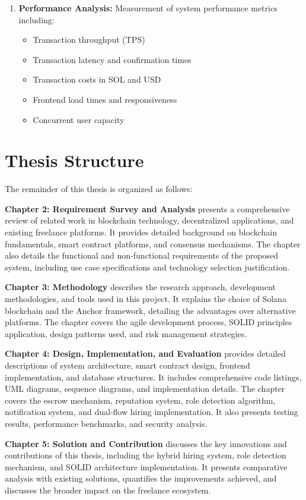 \documentclass[a4paper,13pt,twoside]{report}
\theoremstyle{definition}
\begin{document}
\begin{enumerate}
    \item \textbf{Performance Analysis:} Measurement of system performance metrics including:
    \begin{itemize}
        \item Transaction throughput (TPS)
        \item Transaction latency and confirmation times
        \item Transaction costs in SOL and USD
        \item Frontend load times and responsiveness
        \item Concurrent user capacity
    \end{itemize}
\end{enumerate}

\section{Thesis Structure}

The remainder of this thesis is organized as follows:

\textbf{Chapter 2: Requirement Survey and Analysis} presents a comprehensive review of related work in blockchain technology, decentralized applications, and existing freelance platforms. It provides detailed background on blockchain fundamentals, smart contract platforms, and consensus mechanisms. The chapter also details the functional and non-functional requirements of the proposed system, including use case specifications and technology selection justification.

\textbf{Chapter 3: Methodology} describes the research approach, development methodologies, and tools used in this project. It explains the choice of Solana blockchain and the Anchor framework, detailing the advantages over alternative platforms. The chapter covers the agile development process, SOLID principles application, design patterns used, and risk management strategies.

\textbf{Chapter 4: Design, Implementation, and Evaluation} provides detailed descriptions of system architecture, smart contract design, frontend implementation, and database structures. It includes comprehensive code listings, UML diagrams, sequence diagrams, and implementation details. The chapter covers the escrow mechanism, reputation system, role detection algorithm, notification system, and dual-flow hiring implementation. It also presents testing results, performance benchmarks, and security analysis.

\textbf{Chapter 5: Solution and Contribution} discusses the key innovations and contributions of this thesis, including the hybrid hiring system, role detection mechanism, and SOLID architecture implementation. It presents comparative analysis with existing solutions, quantifies the improvements achieved, and discusses the broader impact on the freelance ecosystem.
\end{document}

